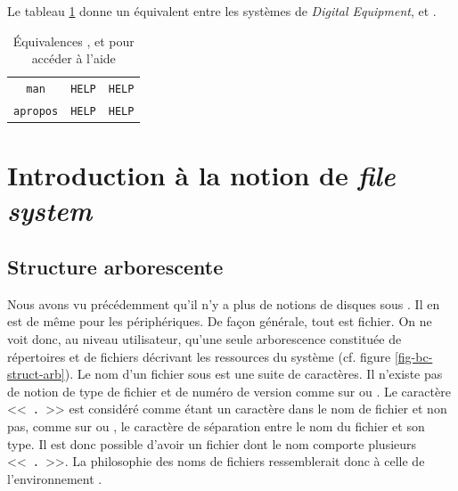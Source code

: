 Le tableau \ref{tab-equiv-man} donne un {\'e}quivalent entre les syst{\`e}mes
{\OpenVMS} de {\sl Digital Equipment}, {\DOS} et {\Unix}.

\begin{table}[hbtp]
\centering
\begin{tabular}{|c|c|c|}
	\hline
	{\Unix}		&	{\OpenVMS}		&	{\DOS} \\
	\hline \hline
	{\tt man}		&	{\tt HELP}		&	{\tt HELP}	\\
	{\tt apropos}	&	{\tt HELP}		&	{\tt HELP}	\\
	\hline
\end{tabular}
\caption{\label{tab-equiv-man}\'{E}quivalences {\OpenVMS},
{\DOS} et {\Unix} pour acc{\'e}der {\`a} l'aide}
\end{table}


\section{Introduction {\`a} la notion de {\sl file system}}

\subsection{Structure arborescente}

Nous avons vu pr{\'e}c{\'e}demment qu'il n'y a plus de notions de
disques sous {\Unix}. Il en est de m{\^e}me pour les
p{\'e}riph{\'e}riques. De fa\c{c}on g{\'e}n{\'e}rale, tout est fichier.
On ne voit donc, au niveau utilisateur, qu'une seule arborescence
constitu{\'e}e de r{\'e}pertoires et de fichiers d{\'e}crivant les
ressources du syst{\`e}me (cf. figure \ref{fig-bc-struct-arb}). Le nom
d'un fichier sous {\Unix} est une suite de caract{\`e}res. Il n'existe
pas de notion de type de fichier et de num{\'e}ro de version comme sur
{\OpenVMS} ou {\DOS}. Le caract{\`e}re <<~{\tt .}~>> est
consid{\'e}r{\'e} comme {\'e}tant un caract{\`e}re dans le nom de
fichier et non pas, comme sur {\OpenVMS} ou {\DOS}, le caract{\`e}re de
s{\'e}paration entre le nom du fichier et son type. Il est donc possible
d'avoir un fichier dont le nom comporte plusieurs <<~{\tt .}~>>. La
philosophie des noms de fichiers ressemblerait donc {\`a} celle de
l'environnement {\MacOS}.

